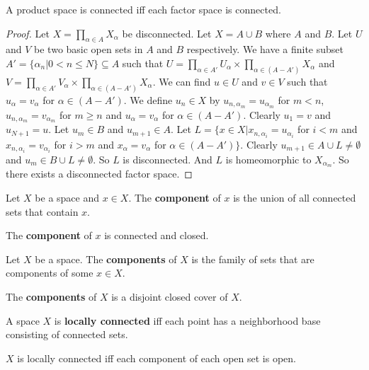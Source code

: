\documentclass[12pt]{book}
\begin{document}
\begin{lemma}
	A product space is connected iff each factor space is connected.
\end{lemma}
\begin{proof}
	Let $X=\prod_{\alpha\in A} X_\alpha$ be disconnected. Let $X=A\cup B$ where $A$ and $B$. Let $U$ and $V$ be two basic open sets in $A$ and $B$ respectively. We have a finite subset $A'=\{\alpha_n|0<n\leq N\}\subseteq A$ such that $U=\prod_{\alpha\in A'}U_\alpha\times\prod_{\alpha\in (A-A')}X_\alpha$ and $V=\prod_{\alpha\in A'}V_\alpha\times\prod_{\alpha\in (A-A')}X_\alpha$. We can find $u\in U$ and $v\in V$ such that $u_\alpha=v_\alpha$ for $\alpha\in (A-A')$. We define $u_n\in X$ by $u_{n,\alpha_m}=u_{\alpha_m}$ for $m<n$, $u_{n,\alpha_m}=v_{\alpha_m}$ for $m\geq n$ and  $u_\alpha=v_\alpha$ for $\alpha\in (A-A')$. Clearly $u_1=v$ and $u_{N+1}=u$. Let $u_m\in B$ and $u_{m+1}\in A$. Let $L=\{x\in X|x_{n,\alpha_i}=u_{\alpha_i}$ for $i<m$ and $x_{n,\alpha_i}=v_{\alpha_i} $ for $i>m$ and $x_\alpha=v_\alpha$ for $\alpha\in (A-A')\}$. Clearly $u_{m+1}\in A\cup L\neq\emptyset$ and $u_m\in B\cup L\neq\emptyset$. So $L$ is disconnected. And $L$ is homeomorphic to $X_{\alpha_m}$. So there exists a disconnected factor space.
\end{proof}

\begin{definition}
	Let $X$ be a space and $x\in X$. The {\bf component} of $x$ is the union of all connected sets that contain $x$.
\end{definition}

\begin{lemma}
	The {\bf component} of $x$ is connected and closed.
\end{lemma}

\begin{definition}
	Let $X$ be a space. The {\bf components} of $X$ is the family of sets that are components of some $x\in X$.
\end{definition}

\begin{lemma}
	The {\bf components} of $X$ is a disjoint closed cover of $X$.
\end{lemma}


\begin{definition}
	A space $X$ is {\bf locally connected} iff each point has a neighborhood base consisting of connected sets.
\end{definition}

\begin{lemma}
	$X$ is locally connected iff each component of each open set is open.
\end{lemma}
\end{document}
